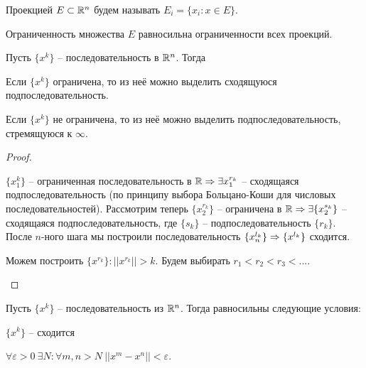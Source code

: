     \begin{Def}
        Проекцией $E \subset \mathbb{R}^n$ будем называть $E_i = \{x_i : x \in E\}$. 
    \end{Def}

    \begin{Rem}
        Ограниченность множества $E$ равносильна ограниченности всех проекций.
    \end{Rem}

    \begin{Thm}
        Пусть $\{x^k\}$ -- последовательность в $\mathbb{R}^n$. Тогда
        \begin{MyList}
            \item Если $\{x^k\}$ ограничена, то из неё можно выделить сходящуюся подпоследовательность.
            \item Если $\{x^k\}$ не ограничена, то из неё можно выделить подпоследовательность, стремящуюся к $\infty$.
        \end{MyList}
    \end{Thm}

    \begin{proof}
        \begin{MyList}
            \item $\{x_1^k\}$ -- ограниченная последовательность в $\mathbb{R} \Rightarrow \exists x_1^{r_k}$ -- сходящаяся подпоследовательность (по принципу выбора Больцано-Коши для числовых последовательностей).
            Рассмотрим теперь $\{x_2^{r_k}\}$ -- ограничена в $\mathbb{R} \Rightarrow \exists \{x_2^{s_k}\}$ -- сходящаяся подпоследовательность, где $\{s_k\}$ -- подпоследовательность $\{r_k\}$.
            После $n$-ного шага мы построили последовательность $\{x_n^{l_k}\} \Rightarrow \{x^{l_k}\}$ сходится.
        
            \item Можем построить $\{x^{r_k}\} : ||x^{r_k}|| > k$. Будем выбирать $r_1 < r_2 < r_3 < ...$. 
        \end{MyList}
    \end{proof}
    
    \begin{Thm}
        Пусть $\{x^k\}$ -- последовательность из $\mathbb{R}^n$. Тогда равносильны следующие условия:
        \begin{MyList}
            \item $\{x^k\}$ -- сходится
            \item $\forall \varepsilon > 0 \ \exists N : \forall m, n > N \ ||x^m - x^n|| < \varepsilon$.
        \end{MyList}
    \end{Thm}

